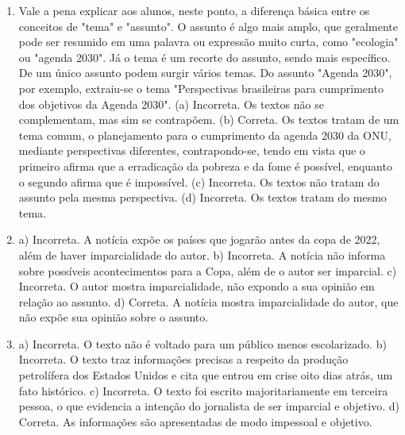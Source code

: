 
\begin{enumerate}
\item
Vale a pena explicar aos alunos, neste ponto, a diferença básica entre os conceitos de "tema" e "assunto". O assunto é algo mais amplo, que geralmente pode ser resumido em uma palavra ou expressão muito curta, como "ecologia" ou "agenda 2030". Já o tema é um recorte do assunto, sendo mais específico. De um único assunto podem surgir vários temas. Do assunto "Agenda 2030", por exemplo, extraiu-se o tema "Perspectivas brasileiras para cumprimento dos objetivos da Agenda 2030".
(a) Incorreta. Os textos não se complementam, mas sim se contrapõem.
(b) Correta. Os textos tratam de um tema comum, o planejamento para o
cumprimento da agenda 2030 da ONU, mediante perspectivas diferentes,
contrapondo-se, tendo em vista que o primeiro afirma que a erradicação
da pobreza e da fome é possível, enquanto o segundo afirma que é
impossível.
(c) Incorreta. Os textos não tratam do assunto pela mesma perspectiva.
(d) Incorreta. Os textos tratam do mesmo tema.

\item
a) Incorreta. A notícia expõe os países que jogarão antes da copa de
2022, além de haver imparcialidade do autor.
b) Incorreta. A notícia não informa sobre possíveis acontecimentos para
a Copa, além de o autor ser imparcial.
c) Incorreta. O autor mostra imparcialidade, não expondo a sua opinião
em relação ao assunto.
d) Correta. A notícia mostra imparcialidade do autor, que não expõe sua
opinião sobre o assunto.

\item
a) Incorreta. O texto não é voltado para um público menos escolarizado.
 b) Incorreta. O texto traz informações precisas a respeito da produção petrolífera dos Estados Unidos e cita que entrou em crise oito dias atrás, um fato histórico. c) Incorreta. O texto foi escrito majoritariamente em terceira pessoa, o que evidencia a intenção do jornalista de ser imparcial e objetivo. d) Correta. As informações são apresentadas de modo impessoal e objetivo.
\end{enumerate}



